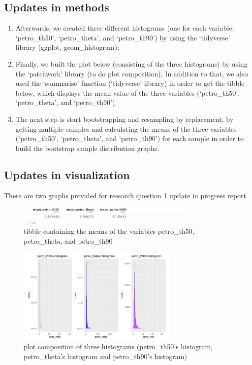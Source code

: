 \documentclass[12pt]{article}
\begin{document}
\subsection{Updates in methods}
\begin{enumerate}
	\item Afterwards, we created three different histograms (one for each variable: `petro\_th50', `petro\_theta', and `petro\_th90') by using the `tidyverse' library (ggplot, geom\_histogram);
	\item Finally, we built the plot below (consisting of the three histograms) by using the `patchwork' library (to do plot composition). In addition to that, we also used the `summarise' function (`tidyverse' library) in order to get the tibble below, which displays the mean value of the three variables (`petro\_th50', `petro\_theta', and `petro\_th90'). 
	\item The next step is start bootstrapping and resampling by replacement, by getting multiple samples and calculating the means of the three variables (`petro\_th50', `petro\_theta', and `petro\_th90') for each sample in order to build the bootstrap sample distribution graphs.
\end{enumerate}

\subsection{Updates in visualization}
There are two graphs provided for research question 1 update in progress report
\begin{figure}[h]
	\centering
	\includegraphics[width=0.8\textwidth]{Graphs/2.png}
	\caption{tibble containing the means of the variables petro\_th50, petro\_theta, and petro\_th90}
\end{figure}


\begin{figure}[h]
	\centering
	\includegraphics[width=0.7\textwidth]{Graphs/1.png}
	\caption{plot composition of three histograms (petro\_th50's histogram, petro\_theta's histogram and petro\_th90's histogram)}
\end{figure}
\end{document}
